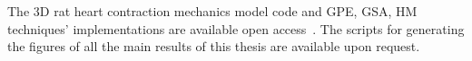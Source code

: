 \vspace{0.2cm}
The $3$D rat heart contraction mechanics model code and GPE, GSA, HM techniques' implementations are available open access~\cite{zenodo:2021,Historia:2021,GPErks:2021}. The scripts for generating the figures of all the main results of this thesis are available upon request.

\endgroup

\vfill